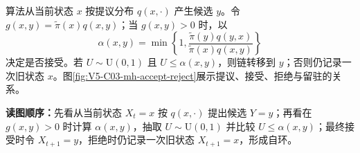 \documentclass[UTF8,a4paper,11pt,openany]{ctexbook}
\begin{document}
\setcounter{page}{636}
\setcounter{chapter}{32}
\setcounter{figure}{4}
\pagestyle{headings}
\MetropolisHastings{} 算法从当前状态 $x$ 按提议分布 $q(x,\cdot)$ 产生候选 $y$。令
$g(x,y)=\widetilde\pi(x)q(x,y)$；当 $g(x,y)>0$ 时，以
\begin{equation}
\alpha(x,y)=\min\!\left\{1,
\frac{\widetilde\pi(y)q(y,x)}{\widetilde\pi(x)q(x,y)}\right\}
\end{equation}
决定是否接受。若 $U\sim\mathrm U(0,1)$ 且 $U\leq\alpha(x,y)$，则链转移到 $y$；否则仍记录一次旧状态 $x$。图\ref{fig:V5-C03-mh-accept-reject}展示提议、接受、拒绝与留驻的关系。

\FloatBarrier
\noindent\textbf{读图顺序：}先看从当前状态 $X_t=x$ 按 $q(x,\cdot)$ 提出候选 $Y=y$；再看在 $g(x,y)>0$ 时计算 $\alpha(x,y)$，抽取 $U\sim\mathrm U(0,1)$ 并比较 $U\le\alpha(x,y)$；最终接受时令 $X_{t+1}=y$，拒绝时仍记录一次旧状态 $X_{t+1}=x$，形成自环。
\end{document}
